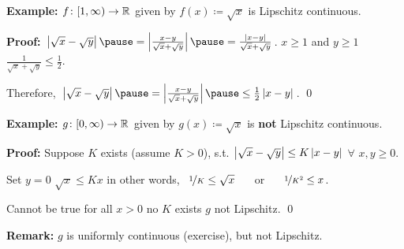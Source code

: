 \documentclass[10pt,aspectratio=169]{beamer}
\begin{document}
\begin{frame}
\textbf{Example:}
$f \colon [1,\infty) \to {\mathbb{R}}$ given by $f(x) \coloneqq \sqrt{x}$
is Lipschitz continuous.

\pause
\medskip

\textbf{Proof:}
$
\abs{\sqrt{x}-\sqrt{y}}
\pause
= 
\abs{\frac{x-y}{\sqrt{x}+\sqrt{y}}}
\pause
=
\frac{\abs{x-y}}{\sqrt{x}+\sqrt{y}}$.
\pause
\qquad
$x \geq 1$ and $y \geq 1$
\wthus $\frac{1}{\sqrt{x}+\sqrt{y}}
\leq \frac{1}{2}$.

\pause
Therefore, \quad
$\abs{\sqrt{x}-\sqrt{y}}
\pause
= 
\abs{\frac{x-y}{\sqrt{x}+\sqrt{y}}}
\pause
\leq
\frac{1}{2}
\abs{x-y}$.
\qed


\puase
\medskip

\textbf{Example:}
$g \colon [0,\infty) \to {\mathbb{R}}$ given by
$g(x) \coloneqq \sqrt{x}$ is \textbf{not} Lipschitz continuous.

\pause
\medskip

\textbf{Proof:}
Suppose $K$ exists (assume $K>0$), s.t. 
$\left\lvert {\sqrt{x}-\sqrt{y}} \right\rvert 
\leq
K \left\lvert {x-y} \right\rvert$ $\forall$ $x,y \geq 0$.

\pause
\medskip

Set $y=0$ \wthus $\sqrt{x} \leq K x$
\qquad
\pause
in other words,
~$\nicefrac{1}{K} \leq \sqrt{x}$ ~~ or ~~ $\nicefrac{1}{K^2} \leq x$.

\pause
Cannot be true for all $x > 0$ \wthus no $K$ exists
\pause
\wthus
$g$ not Lipschitz.
\qed
\pause


\hspace*{\fill}
\hspace*{\fill}

\pause
\medskip

\textbf{Remark:} $g$ is uniformly continuous (exercise), but not Lipschitz.

\end{frame}
\end{document}
